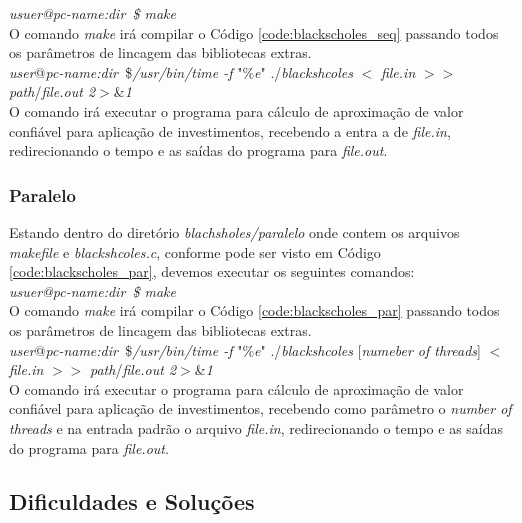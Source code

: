 \documentclass[11pt,twoside]{article}
\begin{document}
        {\it usuer@pc-name:dir~\$ make}\\
        O comando {\it make} irá compilar o Código \ref{code:blackscholes_seq} passando
        todos os parâmetros de lincagem das bibliotecas extras.\\
            
        {\it user}@{\it pc-name:dir~}\${\it /usr/bin/time -f }"\%{\it e}" ./{\it blackshcoles}
        $<$ {\it file.in} $>>$ {\it path}/{\it file.out 2}$>$\&{\it 1}\\
        
            O comando irá executar o programa para cálculo de aproximação de valor confiável
            para aplicação de investimentos, recebendo a entra a de {\it file.in}, 
            redirecionando o tempo e as saídas do programa para {\it file.out}.
        
    \subsubsection{Paralelo}
        Estando dentro do diretório {\it blachsholes/paralelo} onde contem os arquivos
        {\it makefile} e {\it blackshcoles.c}, conforme pode ser visto em Código
        \ref{code:blackscholes_par}, devemos executar os seguintes comandos:\\
        
        {\it usuer@pc-name:dir~\$ make}\\
        
        O comando {\it make} irá compilar o Código \ref{code:blackscholes_par} passando
        todos os parâmetros de lincagem das bibliotecas extras.\\
            
        {\it user}@{\it pc-name:dir~}\${\it /usr/bin/time -f }"\%{\it e}" ./{\it blackshcoles} [{\it numeber of threads}] $<$ {\it file.in} $>>$ {\it path}/{\it file.out 2}$>$\&{\it 1}\\
        O comando irá executar o programa para cálculo de aproximação de valor confiável
        para aplicação de investimentos, recebendo como parâmetro o {\it  number of threads}
        e na entrada padrão o arquivo {\it file.in}, redirecionando o tempo e as saídas do
        programa para {\it file.out}.

    \subsection{Dificuldades e Soluções}
    
\end{document}

